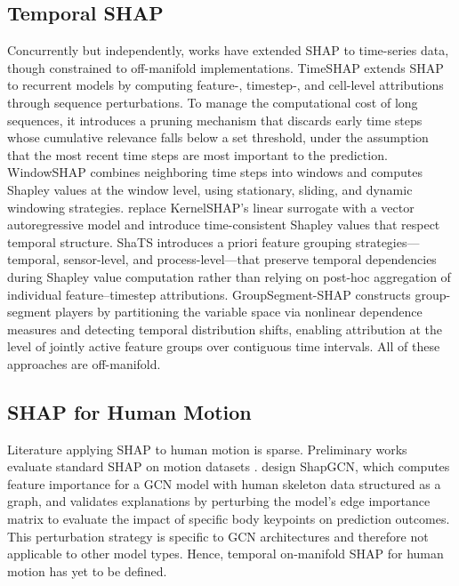\subsection{Temporal SHAP}
Concurrently but independently, works have extended SHAP to time-series data, though constrained to off-manifold implementations. TimeSHAP \citep{timeshap} extends SHAP to recurrent models by computing feature-, timestep-, and cell-level attributions through sequence perturbations. To manage the computational cost of long sequences, it introduces a pruning mechanism that discards early time steps whose cumulative relevance falls below a set threshold, under the assumption that the most recent time steps are most important to the prediction. WindowSHAP \citep{nayebi2023windowshap} combines neighboring time steps into windows and computes Shapley values at the window level, using stationary, sliding, and dynamic windowing strategies. \citet{villani2022feature} replace KernelSHAP's linear surrogate with a vector autoregressive model and introduce time-consistent Shapley values that respect temporal structure. ShaTS \citep{de2025shats} introduces a priori feature grouping strategies—temporal, sensor-level, and process-level—that preserve temporal dependencies during Shapley value computation rather than relying on post-hoc aggregation of individual feature–timestep attributions. GroupSegment-SHAP \citep{kim2026groupsegment} constructs group-segment players by partitioning the variable space via nonlinear dependence measures and detecting temporal distribution shifts, enabling attribution at the level of jointly active feature groups over contiguous time intervals.  All of these approaches are off-manifold.
\subsection{SHAP for Human Motion}
Literature applying SHAP to human motion is sparse. Preliminary works evaluate standard SHAP on motion datasets \citep{tempel2025choose, auletta2023predicting}. \citet{tempel2025explaining} design ShapGCN, which computes feature importance for a GCN model with human skeleton data structured as a graph, and validates explanations by perturbing the model's edge importance matrix to evaluate the impact of specific body keypoints on prediction outcomes. This perturbation strategy is specific to GCN architectures and therefore not applicable to other model types. Hence, temporal on-manifold SHAP for human motion has yet to be defined.


